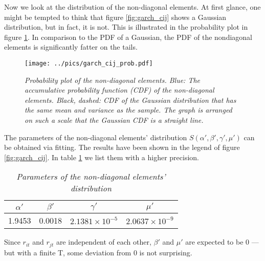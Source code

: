Now we look at the distribution of the non-diagonal elements. At first
glance, one might be tempted to think that figure \ref{fig:garch_cij}
shows a Gaussian distribution, but in fact, it is not. This is
illustrated in the probability plot in figure
\ref{fig:garch_nondiag_probplot}. In comparison to the PDF of a
Gaussian, the PDF of the nondiagonal elements is significantly fatter
on the tails.
\begin{figure}[htb!]
  \centering
  \texttt{[image: ../pics/garch\_cij\_prob.pdf]}
    \caption{\small \it Probability plot of the non-diagonal
      elements. Blue: The accumulative probability function
      (CDF) of the non-diagonal elements. Black, dashed: CDF of the
      Gaussian distribution that has the same mean and variance as the
      sample. The graph is arranged on such a scale that the Gaussian
      CDF is a straight line.
    }
  \label{fig:garch_nondiag_probplot}
\end{figure}

The parameters of the non-diagonal elements' distribution $S(\alpha',
\beta', \gamma', \mu')$ can be obtained via fitting. The results have
been shown in the legend of figure \ref{fig:garch_cij}. In table
\ref{tab:garch_wishart_cij_params} we list them with a higher
precision.
\begin{table}[htb!]
  \centering
  \begin{tabular}{|c|c|c|c|}
    \hline
    $\alpha'$ & $\beta'$ & $\gamma'$ & $\mu'$ \\
    \hline
    1.9453 & 0.0018 & $2.1381 \times 10^{-5}$ & $2.0637\times 10^{-9}$ \\
    \hline
  \end{tabular}
  \caption{\small \it Parameters of the non-diagonal elements' distribution}
  \label{tab:garch_wishart_cij_params}
\end{table}
Since $r_{it}$ and $r_{jt}$ are independent of each other, $\beta'$
and $\mu'$ are expected to be 0 --- but with a finite T, some deviation
from 0 is not surprising.


